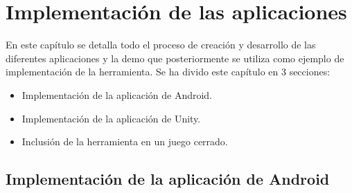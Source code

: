 %
%
%
%
%
%
%
%
%
%

\chapter{Implementaci\'on de las aplicaciones}
\label{cap4}
\label{cap:impl}

En este cap\'itulo se detalla todo el proceso de creaci\'on y desarrollo de las diferentes aplicaciones y la demo que posteriormente se utiliza como ejemplo de implementaci\'on de la herramienta.
Se ha divido este cap\'itulo en 3 secciones:

\begin {itemize}
\item Implementaci\'on de la aplicaci\'on de Android.
\item Implementaci\'on de la aplicaci\'on de Unity.
\item Inclusi\'on de la herramienta en un juego cerrado.
\end {itemize}

\section{Implementaci\'on de la aplicaci\'on de Android}

